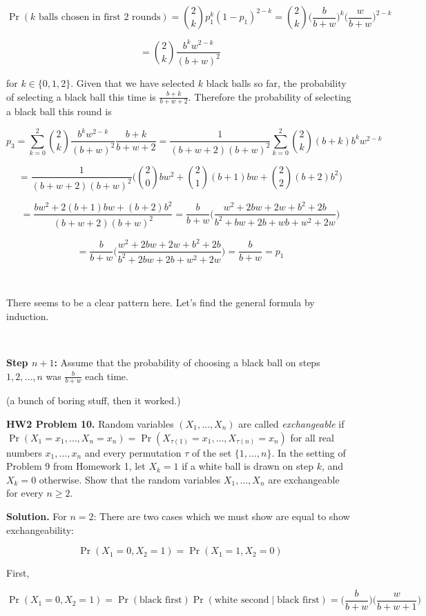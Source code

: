 \[
\Pr(k \text{ balls chosen in first 2 rounds}) = \binom{2}{k}p_1^k(1 - p_1)^{2 - k} = \binom{2}{k} \bigg(\frac{b}{b+w} \bigg)^k \bigg(\frac{w}{b+w} \bigg)^{2 - k}
\]

\[
= \binom{2}{k}\frac{b^k w^{2-k}}{(b+w)^2} 
\]

for \(k \in \{0, 1, 2\}\). Given that we have selected \(k\) black balls so far, the probability of selecting a black ball this time is \(\frac{b + k}{b + w + 2}\). Therefore the probability of selecting a black ball this round is

\[
p_3 = \sum_{k=0}^2 \binom{2}{k}\frac{b^k w^{2-k}}{(b+w)^2} \frac{b + k}{b + w + 2} = \frac{1}{(b+w+2)(b+w)^2} \sum_{k=0}^2 \binom{2}{k} (b+k)b^kw^{2-k}
\]

\[
= \frac{1}{(b+w+2)(b+w)^2} \bigg( \binom{2}{0}bw^2 + \binom{2}{1}(b+1)bw + \binom{2}{2}(b+2)b^2 \bigg)
\]

\[
= \frac{bw^2 + 2(b+1)bw + (b+2)b^2}{(b+w+2)(b+w)^2} = \frac{b}{b+w} \bigg(\frac{w^2 + 2bw + 2w + b^2 + 2b}{b^2 + bw + 2b + wb + w^2 + 2w}\bigg)
\]

\[
=\frac{b}{b+w} \bigg( \frac{w^2 + 2bw + 2w + b^2 + 2b}{b^2 + 2bw + 2b + w^2 + 2w} \bigg) = \frac{b}{b+w} = p_1
\]

\

There seems to be a clear pattern here. Let's find the general formula by induction.

\

\textbf{Step \(n + 1\):} Assume that the probability of choosing a black ball on steps \(1, 2, \dots, n\) was \( \frac{b}{b+w}\) each time.

(a bunch of boring stuff, then it worked.)

\textbf{HW2 Problem 10.} Random variables \((X_1, \ldots, X_n)\) are called \textit{exchangeable} if \(\Pr(X_1 = x_1, \ldots, X_n = x_n) = \Pr(X_{\tau(1)} = x_1, \ldots, X_{\tau(n)} = x_n) \) for all real numbers \(x_1, \ldots, x_n\) and every permutation \(\tau\) of the set \(\{1, \ldots, n\}\). In the setting of Problem 9 from Homework 1, let \(X_k = 1\) if a white ball is drawn on step \(k\), and \(X_k =0\) otherwise. Show that the random variables \(X_1, \ldots, X_n\) are exchangeable for every \(n \geq 2\).

\textbf{Solution.} For \(n =2\): There are two cases which we must show are equal to show exchangeability:

\[
\Pr(X_1 = 0, X_2 = 1) = \Pr(X_1 = 1, X_2 = 0)
\]

First,

\[
\Pr(X_1 = 0, X_2 = 1) = \Pr(\text{black first}) \Pr(\text{white second} \mid \text{black first}) = \bigg( \frac{b}{b+w}\bigg) \bigg( \frac{w}{b+w+1}\bigg)
\]

